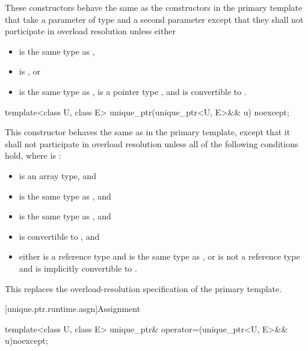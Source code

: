 \begin{itemdescr}
\pnum
These constructors behave the same as
the constructors in the primary template that
take a parameter of type  and a second parameter
except that they
shall not participate in overload resolution unless either
\begin{itemize}
\item {} is the same type as ,
\item {} is , or
\item {} is the same type as ,
       is a pointer type , and
       is convertible to .
\end{itemize}
\end{itemdescr}

%
\begin{itemdecl}
template<class U, class E> unique_ptr(unique_ptr<U, E>&& u) noexcept;
\end{itemdecl}

\begin{itemdescr}
\pnum
This constructor behaves the same as in the primary template,
except that it shall not participate in overload resolution
unless all of the following conditions hold,
where  is :
\begin{itemize}
\item {} is an array type, and
\item {} is the same type as , and
\item {} is the same type as , and
\item {} is convertible to , and
\item either  is a reference type and  is the same type as ,
      or  is not a reference type and  is implicitly convertible to .
\end{itemize}

\begin{note}
This replaces the overload-resolution specification of the primary template.
\end{note}
\end{itemdescr}

[unique.ptr.runtime.asgn]{Assignment}

%
\begin{itemdecl}
template<class U, class E> unique_ptr& operator=(unique_ptr<U, E>&& u)noexcept;
\end{itemdecl}

